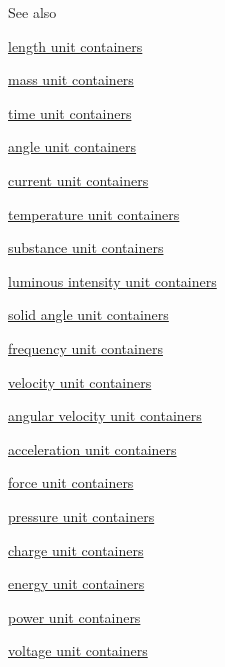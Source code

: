 \begin{DoxySeeAlso}{See also}

\begin{DoxyItemize}
\item \hyperlink{namespaceunits_1_1length_lengthContainers}{length unit containers}
\item \hyperlink{namespaceunits_1_1mass_massContainers}{mass unit containers}
\item \hyperlink{namespaceunits_1_1time_timeContainers}{time unit containers}
\item \hyperlink{namespaceunits_1_1angle_angleContainers}{angle unit containers}
\item \hyperlink{namespaceunits_1_1current_currentContainers}{current unit containers}
\item \hyperlink{namespaceunits_1_1temperature_temperatureContainers}{temperature unit containers}
\item \hyperlink{namespaceunits_1_1substance_substanceContainers}{substance unit containers}
\item \hyperlink{namespaceunits_1_1luminous__intensity_luminousIntensityContainers}{luminous intensity unit containers}
\item \hyperlink{namespaceunits_1_1solid__angle_solidAngleContainers}{solid angle unit containers}
\item \hyperlink{namespaceunits_1_1frequency_frequencyContainers}{frequency unit containers}
\item \hyperlink{namespaceunits_1_1velocity_velocityContainers}{velocity unit containers}
\item \hyperlink{namespaceunits_1_1angular__velocity_angularVelocityContainers}{angular velocity unit containers}
\item \hyperlink{namespaceunits_1_1acceleration_accelerationContainers}{acceleration unit containers}
\item \hyperlink{namespaceunits_1_1force_forceContainers}{force unit containers}
\item \hyperlink{namespaceunits_1_1pressure_pressureContainers}{pressure unit containers}
\item \hyperlink{namespaceunits_1_1charge_chargeContainers}{charge unit containers}
\item \hyperlink{namespaceunits_1_1energy_energyContainers}{energy unit containers}
\item \hyperlink{namespaceunits_1_1power_powerContainers}{power unit containers}
\item \hyperlink{namespaceunits_1_1voltage_voltageContainers}{voltage unit containers}

\end{DoxyItemize}
\end{DoxySeeAlso}

